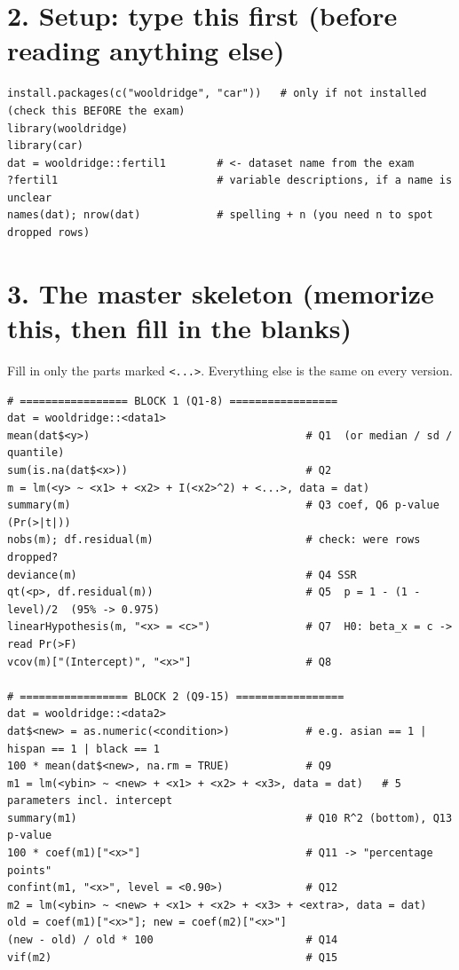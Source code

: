 \documentclass[10pt]{article}
\newcommand{\code}[1]{\texttt{#1}}
\begin{document}
\section*{2. Setup: type this first (before reading anything else)}
\begin{lstlisting}
install.packages(c("wooldridge", "car"))   # only if not installed (check this BEFORE the exam)
library(wooldridge)
library(car)
dat = wooldridge::fertil1        # <- dataset name from the exam
?fertil1                         # variable descriptions, if a name is unclear
names(dat); nrow(dat)            # spelling + n (you need n to spot dropped rows)
\end{lstlisting}

\section*{3. The master skeleton (memorize this, then fill in the blanks)}
Fill in only the parts marked \code{<...>}. Everything else is the same on every version.
\begin{lstlisting}
# ================= BLOCK 1 (Q1-8) =================
dat = wooldridge::<data1>
mean(dat$<y>)                                  # Q1  (or median / sd / quantile)
sum(is.na(dat$<x>))                            # Q2
m = lm(<y> ~ <x1> + <x2> + I(<x2>^2) + <...>, data = dat)
summary(m)                                     # Q3 coef, Q6 p-value (Pr(>|t|))
nobs(m); df.residual(m)                        # check: were rows dropped?
deviance(m)                                    # Q4 SSR
qt(<p>, df.residual(m))                        # Q5  p = 1 - (1 - level)/2  (95% -> 0.975)
linearHypothesis(m, "<x> = <c>")               # Q7  H0: beta_x = c -> read Pr(>F)
vcov(m)["(Intercept)", "<x>"]                  # Q8

# ================= BLOCK 2 (Q9-15) =================
dat = wooldridge::<data2>
dat$<new> = as.numeric(<condition>)            # e.g. asian == 1 | hispan == 1 | black == 1
100 * mean(dat$<new>, na.rm = TRUE)            # Q9
m1 = lm(<ybin> ~ <new> + <x1> + <x2> + <x3>, data = dat)   # 5 parameters incl. intercept
summary(m1)                                    # Q10 R^2 (bottom), Q13 p-value
100 * coef(m1)["<x>"]                          # Q11 -> "percentage points"
confint(m1, "<x>", level = <0.90>)             # Q12
m2 = lm(<ybin> ~ <new> + <x1> + <x2> + <x3> + <extra>, data = dat)
old = coef(m1)["<x>"]; new = coef(m2)["<x>"]
(new - old) / old * 100                        # Q14
vif(m2)                                        # Q15
\end{lstlisting}
\end{document}
